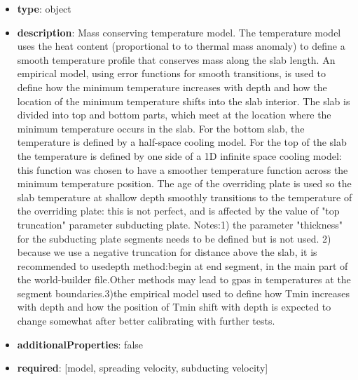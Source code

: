 \begin{itemize}[leftmargin=2em]\item {\bf type}: object
\item {\bf description}: Mass conserving temperature model. The temperature model uses the heat content (proportional to to thermal mass anomaly) to define a smooth temperature profile that conserves mass along the slab length. An empirical model, using error functions for smooth transitions, is used to  define how the minimum temperature increases with depth and how the location of the minimum temperature shifts into the slab interior. The slab is divided into top and bottom parts, which meet at the location where the minimum temperature occurs in the slab. For the bottom slab, the temperature is defined by a half-space cooling model. For the top of the slab the temperature is defined by one side of a 1D infinite space cooling model: this function was chosen to have a smoother temperature function across the minimum temperature position. The age of the overriding plate is used so the slab temperature at shallow depth smoothly transitions to the temperature of the overriding plate: this is not perfect, and is affected by the value of "top truncation" parameter subducting plate. Notes:1) the parameter "thickness" for the subducting plate segments needs to be defined but is not used. 2) because we use a negative truncation for distance above the slab, it is recommended to usedepth method:begin at end segment, in the main part of the world-builder file.Other methods may lead to gpas in temperatures at the segment boundaries.3)the empirical model used to define how Tmin increases with depth and how the position of Tmin shift with depth is expected to change somewhat after better calibrating with further tests.
\item {\bf additionalProperties}: false
\item {\bf required}: [model, spreading velocity, subducting velocity]\end{itemize}
